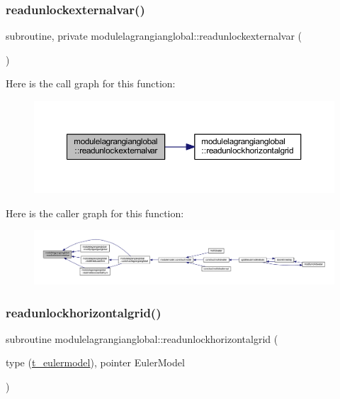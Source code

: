 \subsubsection{\texorpdfstring{readunlockexternalvar()}{readunlockexternalvar()}}
{\footnotesize\ttfamily subroutine, private modulelagrangianglobal\+::readunlockexternalvar (\begin{DoxyParamCaption}{ }\end{DoxyParamCaption})\hspace{0.3cm}{\ttfamily [private]}}

Here is the call graph for this function\+:\nopagebreak
\begin{figure}[H]
\begin{center}
\leavevmode
\includegraphics[width=350pt]{namespacemodulelagrangianglobal_ab2139b94b323af2c1671fe3b4340218f_cgraph}
\end{center}
\end{figure}
Here is the caller graph for this function\+:\nopagebreak
\begin{figure}[H]
\begin{center}
\leavevmode
\includegraphics[width=350pt]{namespacemodulelagrangianglobal_ab2139b94b323af2c1671fe3b4340218f_icgraph}
\end{center}
\end{figure}
\mbox{\label{namespacemodulelagrangianglobal_a4240be74d2a3261aba8c239da33b8efe}} 
\subsubsection{\texorpdfstring{readunlockhorizontalgrid()}{readunlockhorizontalgrid()}}
{\footnotesize\ttfamily subroutine modulelagrangianglobal\+::readunlockhorizontalgrid (\begin{DoxyParamCaption}\item[{type (\mbox{\hyperlink{structmodulelagrangianglobal_1_1t__eulermodel}{t\+\_\+eulermodel}}), pointer}]{Euler\+Model }\end{DoxyParamCaption})\hspace{0.3cm}{\ttfamily [private]}}


